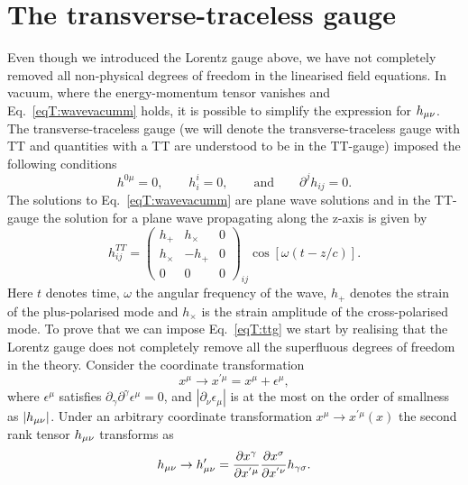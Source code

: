 \section{The transverse-traceless gauge}
Even though we introduced the Lorentz gauge above, we have not completely removed all non-physical degrees of freedom 
in the linearised field equations. In vacuum, where the energy-momentum tensor vanishes and Eq.~\ref{eqT:wavevacumm} holds, it is possible
to simplify the expression for $h_{\mu\nu}$. The transverse-traceless gauge (we will denote the transverse-traceless gauge
with TT and quantities with a TT are understood to be in the TT-gauge) imposed the following conditions
\begin{equation} \label{eqT:ttg}
h^{0 \mu} = 0, \qquad h^{i}_{i} = 0, \qquad \text{and} \qquad \partial^j h_{ij} = 0.
\end{equation}
The solutions to Eq.~\ref{eqT:wavevacumm} are plane wave solutions and in the TT-gauge the 
solution for a plane wave propagating along the z-axis is given by
\begin{equation} \label{eqT:hzdir}
h_{ij}^{TT}=
  \begin{pmatrix}
    h_{+} & h_{\times} & 0  \\
    h_{\times} & -h_{+} & 0 \\
    0 & 0 & 0
  \end{pmatrix}_{ij}
  \cos[\omega(t - z/c)].
\end{equation}
Here $t$ denotes time, $\omega$ the angular frequency of the wave,
$h_+$ denotes the strain of the plus-polarised mode and $h_{\times}$ is the strain amplitude of the cross-polarised mode.
To prove that we can impose Eq.~\ref{eqT:ttg} we start by
realising that the Lorentz gauge does not completely remove all the superfluous degrees of freedom in the theory. Consider the 
coordinate transformation 
\begin{equation} \label{eqT:ct}
x^{\mu} \rightarrow x^{'\mu} = x^{\mu} + \epsilon^{\mu},
\end{equation}
where $\epsilon^{\mu}$ satisfies $\partial_{\gamma} \partial^{\gamma} \epsilon^{\mu} = 0$, 
and $|\partial_{\nu} \epsilon_{\mu}|$ is at the most on the order of smallness as $|h_{\mu\nu}|$.
Under an arbitrary coordinate transformation $x^{\mu} \rightarrow x^{'\mu}(x)$ the second rank tensor $h_{\mu\nu}$ transforms as
\begin{equation} \label{eqT:t2c}
h_{\mu\nu} \rightarrow h'_{\mu\nu} = \frac{\partial x^{\gamma}}{\partial x^{'\mu}} \frac{\partial x^{\sigma}}{\partial x^{'\nu}} h_{\gamma \sigma}.
\end{equation}
